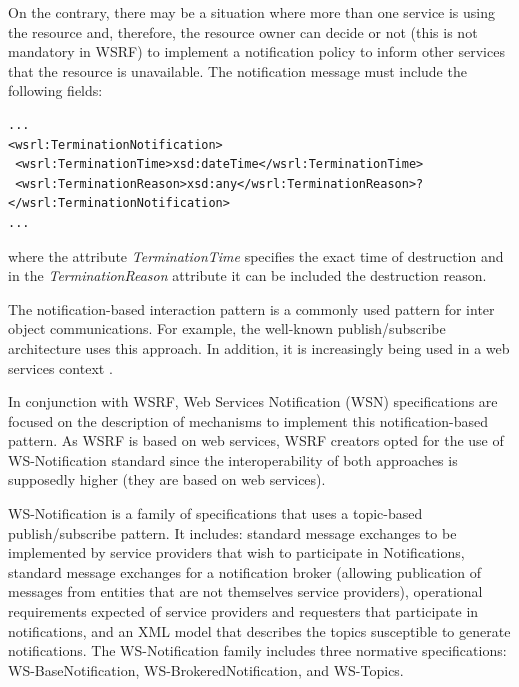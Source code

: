 On the contrary, there may be a situation where more than one service 
is using the resource and, therefore, the resource owner can decide or not 
(this is not mandatory in WSRF) to implement a notification policy
to inform other services that the resource is unavailable. The notification message must include the following fields: 

\begin{lstlisting}
...
<wsrl:TerminationNotification>
 <wsrl:TerminationTime>xsd:dateTime</wsrl:TerminationTime>
 <wsrl:TerminationReason>xsd:any</wsrl:TerminationReason>?
</wsrl:TerminationNotification>
...
\end{lstlisting}
where the attribute \emph{TerminationTime} specifies the exact time of destruction
and in the \emph{TerminationReason} attribute it can be included the destruction reason.

The notification-based interaction pattern is a commonly used pattern
for inter object communications. For example, the well-known
publish/subscribe architecture uses this approach. In addition, it is increasingly being
used in a web services context \cite{}.

In conjunction with WSRF, Web Services Notification (WSN) specifications are focused 
on the description of mechanisms to implement this notification-based pattern. 
As WSRF is based on web services, WSRF creators opted for the use
of WS-Notification standard since the interoperability of both approaches is supposedly higher (they
 are based on web services). 

WS-Notification is a family of specifications that uses a topic-based publish/subscribe
pattern. It includes: standard message exchanges to be implemented by service
providers that wish to participate in Notifications, standard message exchanges for a
notification broker (allowing publication of messages from entities that
are not themselves service providers), operational requirements expected of service providers 
and requesters that participate in notifications, and an XML model that
describes the topics susceptible to generate notifications. The WS-Notification family includes
three normative specifications:
WS-BaseNotification, WS-BrokeredNotification, and WS-Topics.

